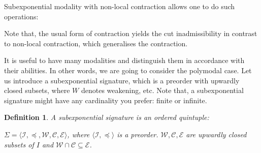 \documentclass[a4paper]{article}
\theoremstyle{defin}
\newtheorem{defin}{Definition}
\theoremstyle{theorem}
\theoremstyle{prop}
\theoremstyle{lemma}
\theoremstyle{ex}
\theoremstyle{col}
\begin{document}
Subexponential modality with non-local contraction allows one to do such operations:

  \vspace{\baselineskip}

\begin{minipage}{0.5\textwidth}
\begin{flushleft}
  \begin{prooftree}
  \end{prooftree}
\end{flushleft}
\end{minipage}\hfill
\begin{minipage}{0.5\textwidth}
\begin{flushright}
  \begin{prooftree}
  \end{prooftree}
\end{flushright}
\end{minipage}

  \vspace{\baselineskip}

Note that, the usual form of contraction yields the cut inadmissibility in contrast to non-local contraction, which generalises the contraction.

  \vspace{\baselineskip}

It is useful to have many modalities and distinguish them in accordance with their abilities. In other words, we are going to
consider the polymodal case. Let us introduce a subexponential signature, which is a preorder with upwardly closed subsets,
where $W$ denotes weakening, etc. Note that, a subexponential signature might have any cardinality you prefer: finite or
infinite.

\begin{defin} A subexponential signature is an ordered quintuple:

  $\Sigma = \langle \mathcal{I}, \preceq, \mathcal{W}, \mathcal{C}, \mathcal{E} \rangle$,
where $\langle \mathcal{I}, \preceq \rangle$ is a preorder.
$\mathcal{W}, \mathcal{C}, \mathcal{E}$ are upwardly closed subsets of $I$ and $\mathcal{W} \cap \mathcal{C} \subseteq \mathcal{E}$.
\end{defin}
\end{document}
